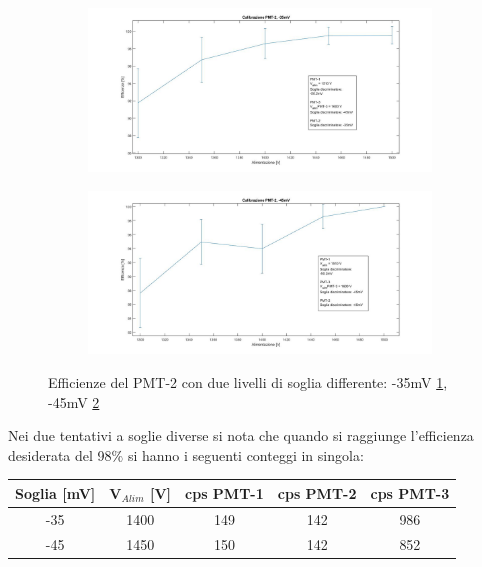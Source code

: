 \documentclass[a4paper]{article}
\begin{document}
\begin{figure}[H]
     \begin{subfigure}[b]{0.49\textwidth}
         \centering
         \includegraphics[width=\textwidth]{./immagini/TimeOfFlight/EffPMT235mV.jpg}
         \caption{}
         \label{fig:EffPMT235mV}
     \end{subfigure}
     \hfill
     \begin{subfigure}[b]{0.49\textwidth}
         \centering
         \includegraphics[width=\textwidth]{./immagini/TimeOfFlight/EffPMT245mV.jpg}
         \caption{}
         \label{fig:EffPMT245mV}
     \end{subfigure}
     \caption{Efficienze del PMT-2 con due livelli di soglia differente: -35mV \ref{fig:EffPMT235mV}, -45mV \ref{fig:EffPMT245mV}}        
     \label{fig:EffPMT2SoglieDis}
\end{figure}

Nei due tentativi a soglie diverse si nota che quando si raggiunge l'efficienza desiderata del 98$\%$ si hanno i seguenti conteggi in singola:

\begin{tabular}{|c|c|c|c|c|}
\hline
Soglia [mV] & V$_{Alim}$ [V] & cps PMT-1 & cps PMT-2 & cps PMT-3\\
\hline
-35 & 1400 & 149 & 142 & 986\\
\hline
-45 & 1450 & 150 & 142 & 852\\
\hline
\end{tabular}
\end{document}
